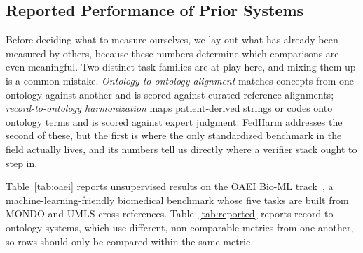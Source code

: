 \documentclass[conference]{IEEEtran}
\begin{document}
\subsection{Reported Performance of Prior Systems}
\label{sec:prior}

Before deciding what to measure ourselves, we lay out what has already been measured by others, because these numbers determine which comparisons are even meaningful. Two distinct task families are at play here, and mixing them up is a common mistake. \emph{Ontology-to-ontology alignment} matches concepts from one ontology against another and is scored against curated reference alignments; \emph{record-to-ontology harmonization} maps patient-derived strings or codes onto ontology terms and is scored against expert judgment. FedHarm addresses the second of these, but the first is where the only standardized benchmark in the field actually lives, and its numbers tell us directly where a verifier stack ought to step in.

Table~\ref{tab:oaei} reports unsupervised results on the OAEI Bio-ML track~\cite{b55}, a machine-learning-friendly biomedical benchmark whose five tasks are built from MONDO and UMLS cross-references. Table~\ref{tab:reported} reports record-to-ontology systems, which use different, non-comparable metrics from one another, so rows should only be compared within the same metric.
\end{document}
